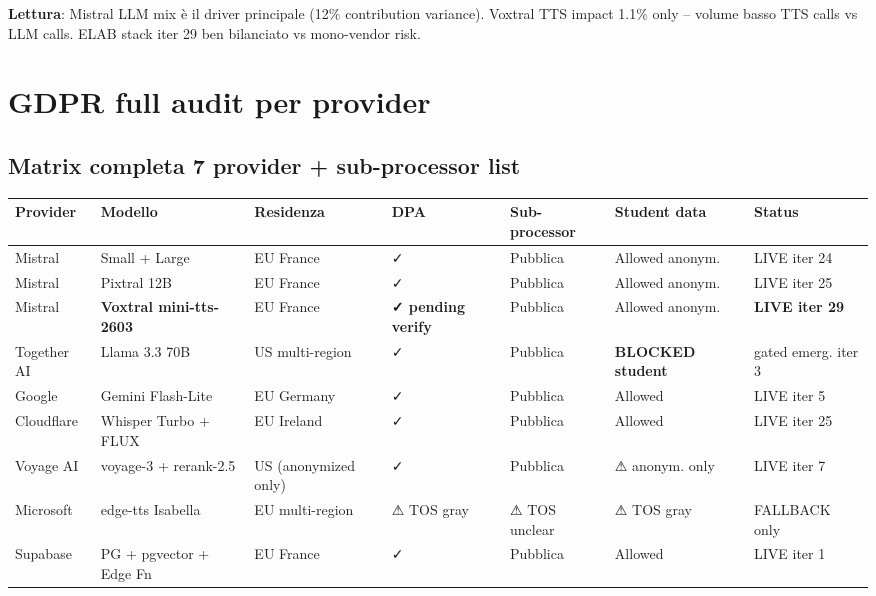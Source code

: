 \documentclass[12pt,a4paper]{article}
\begin{document}
\textbf{Lettura}: Mistral LLM mix è il driver principale (12\% contribution variance). Voxtral TTS impact 1.1\% only -- volume basso TTS calls vs LLM calls. ELAB stack iter 29 ben bilanciato vs mono-vendor risk.

\newpage

\section{GDPR full audit per provider}

\subsection{Matrix completa 7 provider + sub-processor list}

\begin{center}
\renewcommand{\arraystretch}{1.2}
\begin{small}
\begin{longtable}{p{2.0cm} p{2.0cm} p{1.5cm} p{1.0cm} p{2.0cm} p{2.0cm} p{1.5cm}}
\toprule
\textbf{Provider} & \textbf{Modello} & \textbf{Residenza} & \textbf{DPA} & \textbf{Sub-processor} & \textbf{Student data} & \textbf{Status} \\
\midrule
\endfirsthead

Mistral & Small + Large & EU France & ✓ & Pubblica & Allowed anonym. & LIVE iter 24 \\
Mistral & Pixtral 12B & EU France & ✓ & Pubblica & Allowed anonym. & LIVE iter 25 \\
\rowcolor{elablime!18} Mistral & \textbf{Voxtral mini-tts-2603} & EU France & \textbf{✓ pending verify} & Pubblica & Allowed anonym. & \textbf{LIVE iter 29} \\
Together AI & Llama 3.3 70B & US multi-region & ✓ & Pubblica & \textbf{BLOCKED student} & gated emerg. iter 3 \\
Google & Gemini Flash-Lite & EU Germany & ✓ & Pubblica & Allowed & LIVE iter 5 \\
Cloudflare & Whisper Turbo + FLUX & EU Ireland & ✓ & Pubblica & Allowed & LIVE iter 25 \\
Voyage AI & voyage-3 + rerank-2.5 & US (anonymized only) & ✓ & Pubblica & ⚠ anonym. only & LIVE iter 7 \\
Microsoft & edge-tts Isabella & EU multi-region & ⚠ TOS gray & ⚠ TOS unclear & ⚠ TOS gray & FALLBACK only \\
Supabase & PG + pgvector + Edge Fn & EU France & ✓ & Pubblica & Allowed & LIVE iter 1 \\
\bottomrule
\end{longtable}
\end{small}
\end{center}
\end{document}
